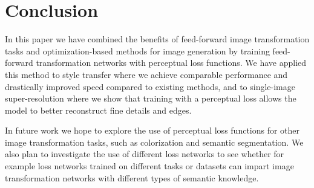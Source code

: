 \documentclass[runningheads]{llncs}
\begin{document}
\vspace{-2mm}
\section{Conclusion}
\vspace{-2mm}
In this paper we have combined the benefits of feed-forward image transformation tasks and
optimization-based methods for image generation by training feed-forward transformation networks
with perceptual loss functions. We have applied this method to style transfer where we achieve
comparable performance and drastically improved speed compared to existing methods, and to
single-image super-resolution where we show that training with a perceptual loss allows the model
to better reconstruct fine details and edges.

In future work we hope to explore the use of perceptual loss functions for other image transformation
tasks, such as colorization and semantic segmentation. We also plan to investigate the use of different
loss networks to see whether for example loss networks trained on different tasks or datasets can
impart image transformation networks with different types of semantic knowledge.


\clearpage

 
\end{document}

